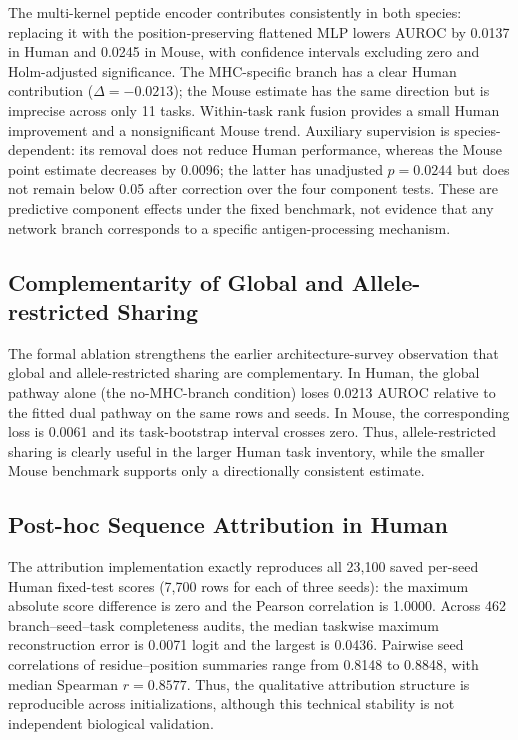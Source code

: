 The multi-kernel peptide encoder contributes consistently in both species: replacing it with the position-preserving flattened MLP lowers AUROC by 0.0137 in Human and 0.0245 in Mouse, with confidence intervals excluding zero and Holm-adjusted significance. The MHC-specific branch has a clear Human contribution ($\Delta=-0.0213$); the Mouse estimate has the same direction but is imprecise across only 11 tasks. Within-task rank fusion provides a small Human improvement and a nonsignificant Mouse trend. Auxiliary supervision is species-dependent: its removal does not reduce Human performance, whereas the Mouse point estimate decreases by 0.0096; the latter has unadjusted $p=0.0244$ but does not remain below 0.05 after correction over the four component tests. These are predictive component effects under the fixed benchmark, not evidence that any network branch corresponds to a specific antigen-processing mechanism.

\subsection{Complementarity of Global and Allele-restricted Sharing}

The formal ablation strengthens the earlier architecture-survey observation that global and allele-restricted sharing are complementary. In Human, the global pathway alone (the no-MHC-branch condition) loses 0.0213 AUROC relative to the fitted dual pathway on the same rows and seeds. In Mouse, the corresponding loss is 0.0061 and its task-bootstrap interval crosses zero. Thus, allele-restricted sharing is clearly useful in the larger Human task inventory, while the smaller Mouse benchmark supports only a directionally consistent estimate.

\subsection{Post-hoc Sequence Attribution in Human}

The attribution implementation exactly reproduces all 23,100 saved per-seed Human fixed-test scores (7,700 rows for each of three seeds): the maximum absolute score difference is zero and the Pearson correlation is 1.0000. Across 462 branch--seed--task completeness audits, the median taskwise maximum reconstruction error is 0.0071 logit and the largest is 0.0436. Pairwise seed correlations of residue--position summaries range from 0.8148 to 0.8848, with median Spearman \(r=0.8577\). Thus, the qualitative attribution structure is reproducible across initializations, although this technical stability is not independent biological validation.

